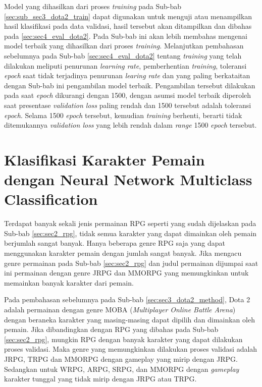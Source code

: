 Model yang dihasilkan dari proses \textit{training} pada Sub-bab \ref{sec:sub_sec3_dota2_train} dapat digunakan untuk menguji atau menampilkan hasil klasifikasi pada data validasi, hasil tersebut akan ditampilkan dan dibahas pada \ref{sec:sec4_eval_dota2}. Pada Sub-bab ini akan lebih membahas mengenai model terbaik yang dihasilkan dari proses \textit{training}. Melanjutkan pembahasan sebelumnya pada Sub-bab \ref{sec:sec4_eval_dota2} tentang \textit{training} yang telah dilakukan meliputi penurunan \textit{learning rate}, pemberhentian \textit{training}, toleransi \textit{epoch} saat tidak terjadinya penurunan \textit{learing rate} dan yang paling berkataitan dengan Sub-bab ini pengambilan model terbaik. Pengambilan tersebut dilakukan pada saat \textit{epoch} dikurangi dengan 1500, dengan asumsi model terbaik diperoleh saat presentase \textit{validation loss} paling rendah dan 1500 tersebut adalah toleransi \textit{epoch}. Selama 1500 \textit{epoch} tersebut, kemudian \textit{training} berhenti, berarti tidak ditemukannya \textit{validation loss} yang lebih rendah dalam \textit{range} 1500 \textit{epoch} tersebut.
\vspace{1ex}

\section{Klasifikasi Karakter Pemain dengan Neural Network Multiclass Classification}
\label{sec:sec3_char_method}
\vspace{1ex}

Terdapat banyak sekali jenis permainan RPG seperti yang sudah dijelaskan pada Sub-bab \ref{sec:sec2_rpg}, tidak semua karakter yang dapat dimainkan oleh pemain berjumlah sangat banyak. Hanya beberapa genre RPG saja yang dapat menggunakan karakter pemain dengan jumlah sangat banyak. Jika mengacu genre permainan pada Sub-bab \ref{sec:sec2_rpg} dan judul permainan dijumpai saat ini permainan dengan genre JRPG dan MMORPG yang memungkinkan untuk memainkan banyak karakter dari pemain.
\vspace{1ex}

Pada pembahasan sebelumnya pada Sub-bab \ref{sec:sec3_dota2_method}, Dota 2 adalah permainan dengan genre MOBA (\textit{Multiplayer Online Battle Arena}) dengan beraneka karakter yang masing-masing dapat dipilih dan dimainkan oleh pemain. Jika dibandingkan dengan RPG yang dibahas pada Sub-bab \ref{sec:sec2_rpg}, mungkin RPG dengan banyak karakter yang dapat dilakukan proses validasi. Maka genre yang memungkinkan dilakukan proses validasi adalah JRPG, TRPG dan MMORPG dengan gameplay yang mirip dengan JRPG. Sedangkan untuk WRPG, ARPG, SRPG, dan MMORPG dengan \textit{gameplay} karakter tunggal yang tidak mirip dengan JRPG atau TRPG.
\vspace{1ex}

